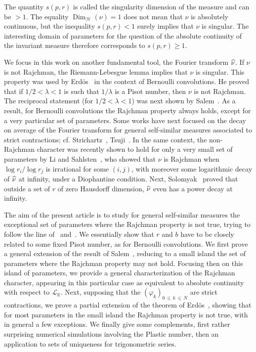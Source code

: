 \documentclass[10pt]{amsart}
\theoremstyle{definition}\newtheorem{defi}[theo]{Definition}\newtheorem{rema}[theo]{Remark}\newtheorem{exam}[theo]{Example}\newtheorem{exem}[theo]{Example}\newtheorem{nota}[theo]{Notation}
\newcommand{\Rbb}{\mathbb R}
\newcommand{\Lcl}{\mathcal{L}}
\newcommand{\Hcl}{\mathcal{H}}
\DeclareMathOperator{\Dim}{Dim}
\let\oldhat\hat
\renewcommand*{\hat}[1]{\mathchoice{\widehat{#1}}{\widehat{#1}}{\oldhat{#1}}{\oldhat{#1}}}
\begin{document}
The quantity $s(p,r)$ is called the singularity dimension of the measure and can be $>1$. The equality $\Dim_{{\Hcl}}(\nu)=1$ does not mean that $\nu$ is absolutely continuous, but the inequality $s(p,r)<1$ surely implies that $\nu$ is singular. The interesting domain of parameters for the question of the absolute continuity of the invariant measure therefore corresponds to $s(p,r)\geq1$.

We focus in this work on another fundamental tool, the Fourier transform $\hat{\nu}$. If $\nu$ is not Rajchman, the Riemann-Lebesgue lemma implies that $\nu$ is singular. This property was used by Erd\"os~\cite{erdos} in the context of Bernoulli convolutions. He proved that if $1/2<\lambda<1$ is such that $1/\lambda$ is a Pisot number, then $\nu$ is not Rajchman. The reciprocal statement (for $1/2<\lambda<1$) was next shown by Salem~\cite{salem}. As a result, for Bernoulli convolutions the Rajchman property always holds, except for a very particular set of parameters. Some works have next focused on the decay on average of the Fourier transform for general self-similar measures associated to strict contractions; cf. Strichartz~\cite{stri1,stri2}, Tsuji~\cite{tsu}. In the same context, the non-Rajchman character was recently shown to hold for only a very small set of parameters by Li and Sahlsten~\cite{lisa}, who showed that $\nu$ is Rajchman when $\log r_i/\log r_j$ is irrational for some $(i,j)$, with moreover some logarithmic decay of $\hat{\nu}$ at infinity, under a Diophantine condition. Next, Solomyak~\cite{solo2} proved that outside a set of $r$ of zero Hausdorff dimension, $\hat{\nu}$ even has a power decay at infinity.

The aim of the present article is to study for general self-similar measures the exceptional set of parameters where the Rajchman property is not true, trying to follow the line of~\cite{erdos} and~\cite{salem}. We essentially show that $r$ and $b$ have to be closely related to some fixed Pisot number, as for Bernoulli convolutions. We first prove a general extension of the result of Salem~\cite{salem}, reducing to a small island the set of parameters where the Rajchman property may not hold. Focusing then on this island of parameters, we provide a general characterization of the Rajchman character, appearing in this particular case as equivalent to absolute continuity with respect to ${\Lcl}_{\Rbb}$. Next, supposing that the $(\varphi_k)_{0\,\leq\,k\,\leq\,N}$ are strict contractions, we prove a partial extension of the theorem of Erd\"os~\cite{erdos}, showing that for most parameters in the small island the Rajchman property is not true, with in general a few exceptions. We finally give some complements, first rather surprising numerical simulations involving the Plastic number, then an application to sets of uniqueness for trigonometric series.
\end{document}
